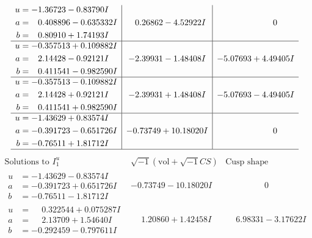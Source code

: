 \documentclass[1p]{elsarticle_modified}
\theoremstyle{definition}
\newcommand{\I}{\sqrt{-1}}
\begin{document}
$$\begin{array}{c|c|c}
\begin{aligned}
u &= -1.36723 - 0.83790 I \\
a &= \phantom{-}0.408896 - 0.635332 I \\
b &= \phantom{-}0.80910 + 1.74193 I\end{aligned}
 & \phantom{-}0.26862 - 4.52922 I & \phantom{-0.000000 } 0 \\ \hline\begin{aligned}
u &= -0.357513 + 0.109882 I \\
a &= \phantom{-}2.14428 - 0.92121 I \\
b &= \phantom{-}0.411541 - 0.982590 I\end{aligned}
 & -2.39931 - 1.48408 I & -5.07693 + 4.49405 I \\ \hline\begin{aligned}
u &= -0.357513 - 0.109882 I \\
a &= \phantom{-}2.14428 + 0.92121 I \\
b &= \phantom{-}0.411541 + 0.982590 I\end{aligned}
 & -2.39931 + 1.48408 I & -5.07693 - 4.49405 I \\ \hline\begin{aligned}
u &= -1.43629 + 0.83574 I \\
a &= -0.391723 - 0.651726 I \\
b &= -0.76511 + 1.81712 I\end{aligned}
 & -0.73749 + 10.18020 I & \phantom{-0.000000 } 0\\
 \hline 
 \end{array}$$\newpage$$\begin{array}{c|c|c}  
\text{Solutions to }I^u_{1}& \I (\text{vol} + \sqrt{-1}CS) & \text{Cusp shape}\\
 \hline 
\begin{aligned}
u &= -1.43629 - 0.83574 I \\
a &= -0.391723 + 0.651726 I \\
b &= -0.76511 - 1.81712 I\end{aligned}
 & -0.73749 - 10.18020 I & \phantom{-0.000000 } 0 \\ \hline\begin{aligned}
u &= \phantom{-}0.322544 + 0.075287 I \\
a &= \phantom{-}2.13709 + 1.54640 I \\
b &= -0.292459 - 0.797611 I\end{aligned}
 & \phantom{-}1.20860 + 1.42458 I & \phantom{-}6.98331 - 3.17622 I \\ \hline\begin{aligned}

\end{aligned}
\end{array}$$
\end{document}
